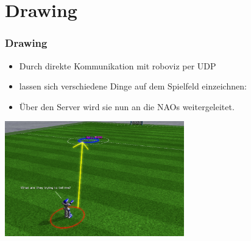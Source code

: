 
\section{Drawing}
  
\frame
{
  \frametitle{Drawing}
  \begin{itemize}
    \item<1-> Durch direkte Kommunikation mit roboviz per UDP
    \item<2-> lassen sich verschiedene Dinge auf dem Spielfeld einzeichnen:
    \item<3-> \"Uber den Server wird sie nun an die NAOs weitergeleitet.
  \end{itemize}
  
  \begin{center}\includegraphics[height=5cm, center]{Drawing.png}\end{center}
}
